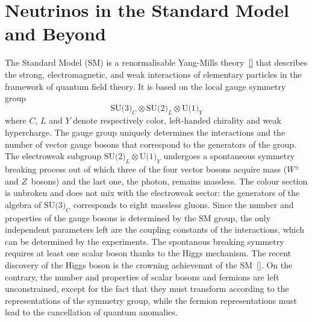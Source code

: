 
\clearpage
\chapter{Neutrinos in the Standard Model and Beyond}
\label{cha:intro}

The Standard Model (SM) is a renormalisable Yang-Mills theory~\ref{} that describes the strong, electromagnetic, and weak interactions %
of elementary particles in the framework of quantum field theory.
It is based on the local gauge symmetry group 
\begin{equation}
	\label{eq:smgroup}
	\text{SU(3)}_C \otimes \text{SU(2)}_L \otimes \text{U(1)}_Y
\end{equation}
where $C$, $L$ and $Y$ denote respectively color, left-handed chirality and weak hypercharge.
The gauge group uniquely determines the interactions and the number of %
vector gauge bosons that correspond to the generators of the group.
%
The electroweak subgroup $\text{SU(2)}_L \otimes \text{U(1)}_Y$ undergoes a spontaneous symmetry breaking process %
out of which three of the four vector bosons acquire mass ($W^\pm$ and $Z$~bosons) and the last one, the photon, remains massless.
The colour section is unbroken and does not mix with the electroweak sector: %
the generators of the algebra of $\text{SU(3)}_C$ corresponds to eight massless gluons.
%
Since the number and properties of the gauge bosons is determined by the SM group, %
the only independent parameters left are the coupling constants of the interactions, which can be determined by the experiments.
The spontanous breaking symmetry requires at least one scalar boson thanks to the Higgs mechanism.
The recent discovery of the Higgs boson is the crowning achievemnt of the SM~\ref{}.
On the contrary, the number and properties of scalar bosons and fermions are left unconstrained, %
except for the fact that they must transform according to the representations of the symmetry group, %
while the fermion representations must lead to the cancellation of quantum anomalies.

